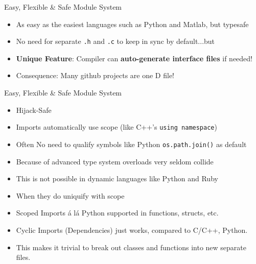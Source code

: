 \documentclass[xcolor=dvipsnames]{beamer}
\begin{document}
\begin{frame}[fragile]{Easy, Flexible \& Safe Module System}
  \begin{itemize}[<+->]
  \item As easy as the easiest languages such as Python and Matlab, but typesafe
  \item No need for separate \texttt{.h} and \texttt{.c} to keep in sync by
    default...but
  \item \textbf{Unique Feature}: Compiler can \textbf{auto-generate interface
      files} if needed!
  \item Consequence: Many github projects are one D file!
  \end{itemize}
\end{frame}

\begin{frame}[fragile]{Easy, Flexible \& Safe Module System}
  \begin{itemize}[<+->]
  \item Hijack-Safe
  \item Imports automatically use scope (like C++’s \texttt{using namespace})
  \item Often No need to qualify symbols like Python \texttt{os.path.join()} as
    default
  \item Because of advanced type system overloads very seldom collide
  \item This is not possible in dynamic languages like Python and Ruby
  \item When they do uniquify with scope
  \item Scoped Imports á lá Python supported in functions, structs, etc.
  \item Cyclic Imports (Dependencies) just works, compared to C/C++,
    Python.
  \item This makes it trivial to break out classes and functions into new
    separate files.
  \end{itemize}
\end{frame}
\end{document}
